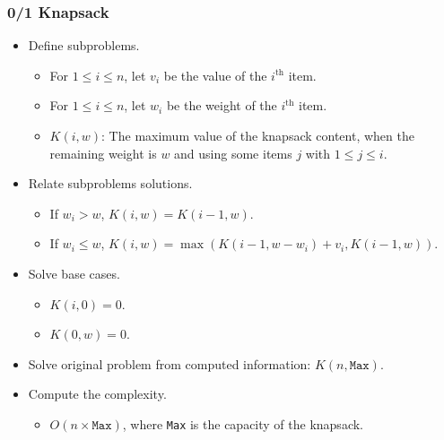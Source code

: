 \documentclass{beamer}
\begin{document}
\begin{frame}%
\frametitle{0/1 Knapsack}

\footnotesize

\begin{itemize}

\item Define subproblems.
\begin{itemize}
\footnotesize
\item<1-> For $1 \le i \le n$, let $v_i$ be the value of the $i^{\textrm{th}}$ item.
\item<1-> For $1 \le i \le n$, let $w_i$ be the weight of the $i^{\textrm{th}}$ item.
\item<2-> $K(i, w)$: The maximum value of the knapsack content, when the remaining weight is $w$ and
using some items $j$ with $1 \le j \le i$.
\end{itemize}

\vspace{0.1cm}

\item<3-> Relate subproblems solutions.
\begin{itemize}
\footnotesize
\item<3-> If $w_i > w$, $K(i, w) = K(i - 1, w)$.
\item<4-> If $w_i \le w$, $K(i, w) = \max(K(i - 1, w - w_i) + v_i, K(i - 1, w))$.
\end{itemize}

\vspace{0.1cm}

\item<5-> Solve base cases.
\begin{itemize}
\footnotesize
\item<5-> $K(i, 0) = 0$.
\item<5-> $K(0, w) = 0$.%
\end{itemize}

\vspace{0.1cm}

\item<6-> Solve original problem from computed information: $K(n, \texttt{Max})$.

\vspace{0.1cm}

\item<7-> Compute the complexity.
\begin{itemize}
\footnotesize
\item<7> $O(n\times \texttt{Max})$, where \texttt{Max} is the capacity of the knapsack.
\end{itemize}

\end{itemize}

\end{frame}
\end{document}

